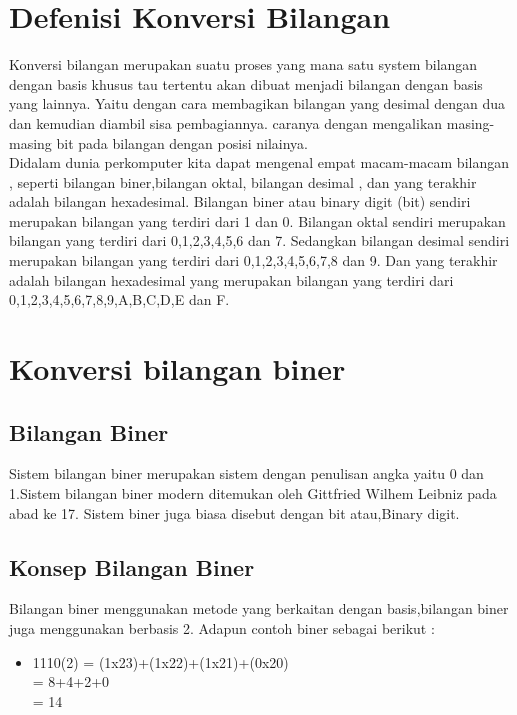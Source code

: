 
\section{Defenisi Konversi Bilangan}
Konversi bilangan merupakan suatu proses yang mana satu system bilangan dengan basis khusus tau tertentu akan dibuat menjadi bilangan dengan basis yang lainnya. 
Yaitu dengan cara membagikan bilangan yang desimal dengan dua dan kemudian diambil sisa pembagiannya.
caranya dengan mengalikan masing-masing bit pada bilangan dengan posisi nilainya.
\\Didalam dunia perkomputer kita dapat mengenal empat macam-macam bilangan , seperti bilangan biner,bilangan oktal, bilangan desimal , dan yang terakhir adalah bilangan hexadesimal. Bilangan biner atau binary digit (bit) sendiri merupakan bilangan yang terdiri dari 1 dan 0. Bilangan oktal sendiri merupakan bilangan yang terdiri dari 0,1,2,3,4,5,6 dan 7.
Sedangkan bilangan desimal sendiri merupakan bilangan yang terdiri dari 0,1,2,3,4,5,6,7,8 dan 9. Dan yang terakhir adalah bilangan hexadesimal yang merupakan bilangan yang terdiri dari 0,1,2,3,4,5,6,7,8,9,A,B,C,D,E dan F.

\section{Konversi bilangan biner}
\subsection{Bilangan Biner}
Sistem bilangan biner merupakan sistem dengan penulisan angka yaitu 0 dan 1.Sistem bilangan biner  modern ditemukan oleh Gittfried Wilhem Leibniz pada abad ke 17. Sistem biner juga biasa disebut dengan bit atau,Binary digit.
\subsection{Konsep Bilangan Biner}
Bilangan biner menggunakan metode yang berkaitan dengan basis,bilangan biner juga menggunakan berbasis 2. Adapun contoh biner sebagai berikut : \\
\begin{itemize}
\item 1110(2) = (1x23)+(1x22)+(1x21)+(0x20)\\
   	  = 8+4+2+0\\
             = 14  
\end{itemize}
